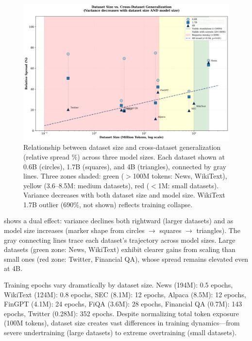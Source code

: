\begin{figure}[htbp]
\centering
\includegraphics[width=\textwidth]{figures/scatter_size_variance.png}
\caption[Dataset Size vs. Generalization Across Model Scales]{Relationship between dataset size and cross-dataset generalization (relative spread \%) across three model sizes. Each dataset shown at 0.6B (circles), 1.7B (squares), and 4B (triangles), connected by gray lines. Three zones shaded: green ($>$100M tokens: News, WikiText), yellow (3.6–8.5M: medium datasets), red ($<$1M: small datasets). Variance decreases with both dataset size and model size. WikiText 1.7B outlier (690\%, not shown) reflects training collapse.}
\label{fig:scatter_size_variance}
\end{figure}

 shows a dual effect: variance declines both rightward (larger datasets) and as model size increases (marker shape from circles \(\to\) squares \(\to\) triangles). The gray connecting lines trace each dataset's trajectory across model sizes. Large datasets (green zone: News, WikiText) exhibit clearer gains from scaling than small ones (red zone: Twitter, Financial QA), whose spread remains elevated even at 4B.

Training epochs vary dramatically by dataset size. News (194M): 0.5 epochs, WikiText (124M): 0.8 epochs, SEC (8.1M): 12 epochs, Alpaca (8.5M): 12 epochs, FinGPT (4.1M): 24 epochs, FiQA (3.6M): 28 epochs, Financial QA (0.7M): 143 epochs, Twitter (0.28M): 352 epochs. Despite normalizing total token exposure (100M tokens), dataset size creates vast differences in training dynamics—from severe undertraining (large datasets) to extreme overtraining (small datasets).

